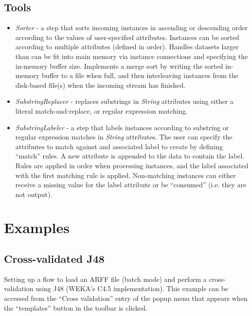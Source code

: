 \subsection{Tools}

\begin{itemize}
   \item \textit{Sorter} - a step that sorts incoming instances in ascending or descending order
     according to the values of user-specified attributes. Instances can be sorted according to
     multiple attributes (defined in order). Handles datasets larger than can be fit into main
     memory via instance connections and specifying the in-memory buffer size. Implements a 
     merge sort by writing the sorted in-memory buffer to a file when full, and then interleaving
     instances from the disk-based file(s) when the incoming stream has finished.
   \item \textit{SubstringReplacer} - replaces substrings in \textit{String} attributes using either
     a literal match-and-replace, or regular expression matching.
   \item \textit{SubstringLabeler} - a step that labels instances according to substring or regular
     expression matches in \textit{String} attributes. The user can specify the attributes to match
     against and associated label to create by defining ``match'' rules. A new attribute is appended
     to the data to contain the label. Rules are applied in order when processing instances, and the
     label associated with the first matching rule is applied. Non-matching instances can either receive
     a missing value for the label attribute or be ``consumed'' (i.e. they are not output).
\end{itemize}


\newpage
\section{Examples}


\subsection{Cross-validated J48}
Setting up a flow to load an ARFF file (batch mode) and
perform a cross-validation using J48 (WEKA's C4.5 implementation). This example
can be accessed from the ``Cross validation'' entry of the popup menu that
appears when the ``templates'' button in the toolbar is clicked.

